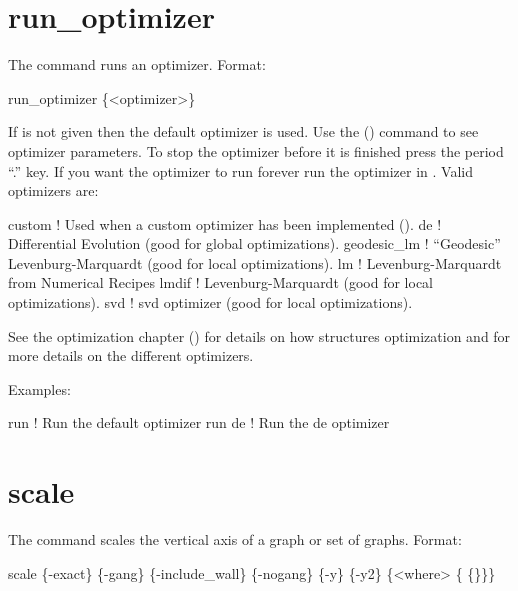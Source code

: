 \section{run_optimizer}
\label{s:run}

The  command runs an optimizer. Format:
\begin{example}
  run_optimizer \{<optimizer>\}
\end{example}

\vskip 10pt 

If  is not given then the default optimizer is used.  Use the 
() command to see optimizer parameters.  To stop the optimizer before it is
finished press the period ``.''  key. If you want the optimizer to run forever run the optimizer in
. Valid optimizers are:
\begin{example}
  custom        ! Used when a custom optimizer has been implemented ().
  de            ! Differential Evolution (good for global optimizations).
  geodesic_lm   ! ``Geodesic'' Levenburg-Marquardt (good for local optimizations).
  lm            ! Levenburg-Marquardt from Numerical Recipes 
  lmdif         ! Levenburg-Marquardt (good for local optimizations).
  svd           ! svd optimizer (good for local optimizations).
\end{example}

See the optimization chapter () for details on how \tao structures optimization and for
more details on the different optimizers.

Examples:
\begin{example}
  run         ! Run the default optimizer
  run de      ! Run the de optimizer
\end{example}

\section{scale}
\label{s:scale}

The  command scales the vertical axis of a graph or set of graphs.  Format:
\begin{example}
  scale \{-exact\} \{-gang\} \{-include_wall\} \{-nogang\} 
             \{-y\} \{-y2\} \{<where> \{<value1> \{<value2>\}\}\}
\end{example}

